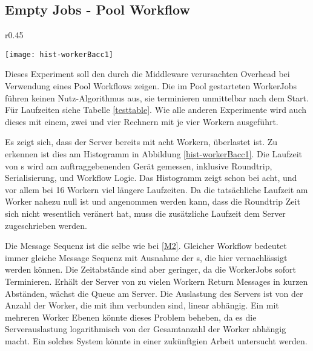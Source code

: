 \clearpage
\subsection{Empty Jobs - Pool Workflow}
\label{M3}

\begin{wrapfigure}{r}{0.45\textwidth}
  \vspace{-30pt}
  \begin{center}
    \texttt{[image: hist-workerBacc1]}
    \caption{Experiment \ref{M3} WorkerJob Laufzeiten aller 25 Iterationen in 50bins.  Bei Pool Workflow sollte sich das Histogram nicht ändern.}
    \label{hist-workerBacc1}
  \end{center}
\end{wrapfigure}

Dieses Experiment soll den durch die Middleware verursachten Overhead bei Verwendung eines Pool Workflows zeigen.
Die im Pool gestarteten WorkerJobs führen keinen Nutz-Algorithmus aus, sie terminieren unmittelbar nach dem Start.
Für Laufzeiten siehe Tabelle \ref{testtable}.
Wie alle anderen Experimente wird auch dieses mit einem, zwei und vier Rechnern mit je vier Workern ausgeführt.

Es zeigt sich, dass der Server bereits mit acht Workern, überlastet ist.
Zu erkennen ist dies am Histogramm in Abbildung \ref{hist-workerBacc1}.
Die Laufzeit von \remoteJob s wird am auftraggebenenden Gerät gemessen, inklusive Roundtrip, Serialisierung, und Workflow Logic.
Das Histogramm zeigt schon bei acht, und vor allem bei 16 Workern viel längere Laufzeiten.
Da die tatsächliche Laufzeit am Worker nahezu null ist und angenommen werden kann, dass die Roundtrip Zeit sich nicht wesentlich veränert hat, muss die zusätzliche Laufzeit dem Server zugeschrieben werden.

Die Message Sequenz ist die selbe wie bei \ref{M2}.
Gleicher Workflow bedeutet immer gleiche Message Sequenz mit Ausnahme der \UpdateMessage s, die hier vernachlässigt werden können.
Die Zeitabstände sind aber geringer, da die WorkerJobs sofort Terminieren.
Erhält der Server von zu vielen Workern Return Messages in kurzen Abständen, wächst die Queue am Server.
Die Auslastung des Servers ist von der Anzahl der Worker, die mit ihm verbunden sind, linear abhängig.
Ein \hcsno{} mit mehreren Worker Ebenen könnte dieses Problem beheben, da es die Serverauslastung logarithmisch von der Gesamtanzahl der Worker abhängig macht.
Ein solches System könnte in einer zukünftgien Arbeit untersucht werden.

